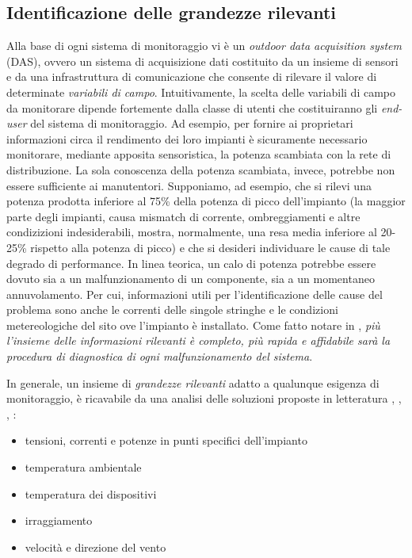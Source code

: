 \subsection{Identificazione delle grandezze rilevanti}
Alla base di ogni sistema di monitoraggio vi \`e un \emph{outdoor data acquisition system} 
(DAS), ovvero un sistema di acquisizione dati costituito da un insieme di sensori 
e da una infrastruttura di comunicazione che consente di rilevare il valore di 
determinate \emph{variabili di campo}. 
Intuitivamente, la scelta delle variabili di campo da monitorare dipende fortemente dalla 
classe di utenti che costituiranno gli \emph{end-user} del sistema di monitoraggio.
%
Ad esempio, per fornire ai proprietari informazioni circa il rendimento dei loro impianti 
\`e sicuramente necessario monitorare, mediante apposita sensoristica, la potenza scambiata 
con la rete di distribuzione. La sola conoscenza della potenza scambiata, invece, potrebbe 
non essere sufficiente ai manutentori.
%
Supponiamo, ad esempio, che si rilevi una potenza prodotta inferiore al 75\% della potenza di picco
dell'impianto (la maggior parte degli impianti, causa mismatch di corrente, ombreggiamenti e 
altre condizizioni indesiderabili, mostra, normalmente, una resa media inferiore al 20-25\% rispetto 
alla potenza di picco\cite{roman06}) e che si desideri individuare le cause di tale degrado 
di performance.
%
In linea teorica, un calo di potenza potrebbe essere dovuto sia a un malfunzionamento 
di un componente, sia a un momentaneo annuvolamento. Per cui, informazioni utili per 
l'identificazione delle cause del problema sono anche le correnti delle singole stringhe e le 
condizioni metereologiche del sito ove l'impianto \`e installato.
%
Come fatto notare in \cite{kolodenny08}, \emph{pi\`u l'insieme delle informazioni rilevanti 
\`e completo, pi\`u rapida e affidabile sar\`a la procedura di diagnostica di ogni 
malfunzionamento del sistema}.
%

%
In generale, un insieme di \emph{grandezze rilevanti} adatto a qualunque esigenza 
di monitoraggio, \`e ricavabile da una analisi delle soluzioni proposte in letteratura
\cite{xiaoli11}, \cite{dirks06}, \cite{kolodenny06}, \cite{aristizabal06}: %
%
\begin{itemize}
\item tensioni, correnti e potenze in punti specifici dell'impianto
\item temperatura ambientale
\item temperatura dei dispositivi
\item irraggiamento
\item velocit\`a e direzione del vento
\end{itemize}
%
%
